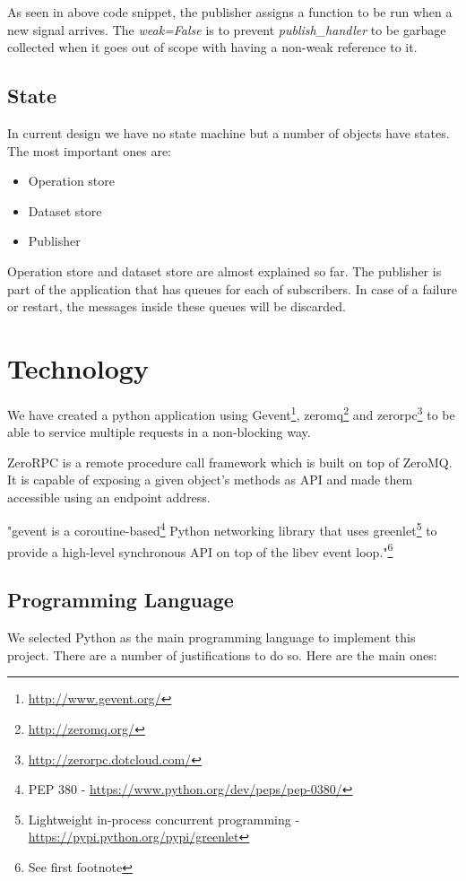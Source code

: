 As seen in above code snippet, the publisher assigns a function to be run when
a new signal arrives. The \textit{weak=False} is to prevent \textit{publish\_handler}
to be garbage collected when it goes out of scope with having a non-weak reference to it.

\subsection{State}
In current design we have no state machine but a number of objects have states.
The most important ones are:
\begin{itemize}
\item Operation store
\item Dataset store
\item Publisher
\end{itemize}

Operation store and dataset store are almost explained so far. 
The publisher is part of the application that has queues for each of subscribers.
In case of a failure or restart, the messages inside these queues will be discarded.

\section{Technology}
We have created a python application using Gevent\footnote{\url{http://www.gevent.org/}},
zeromq\footnote{\url{http://zeromq.org/}} and zerorpc\footnote{\url{http://zerorpc.dotcloud.com/}} 
to be able to service multiple requests in a non-blocking way.

ZeroRPC is a remote procedure call framework which is built on top of ZeroMQ.
It is capable of exposing a given object's methods as API and made them accessible using an endpoint address.

"gevent is a coroutine-based\footnote{PEP 380 - \url{https://www.python.org/dev/peps/pep-0380/}}
Python networking library that 
uses greenlet\footnote{Lightweight in-process concurrent programming - \url{https://pypi.python.org/pypi/greenlet}} 
to provide a high-level synchronous API on top of the libev event loop."\footnote{See first footnote}


\subsection{Programming Language}
We selected Python as the main programming language to implement this project. 
There are a number of justifications to do so. Here are the main ones:

